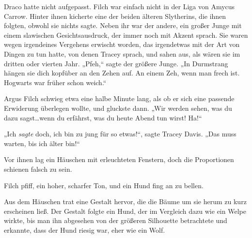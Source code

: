 Draco hatte nicht aufgepasst. Filch war einfach nicht in der Liga von Amycus Carrow.
Hinter ihnen kicherte eine der beiden älteren Slytherins, die ihnen folgten, obwohl sie nichts sagte. Neben ihr war der andere, ein großer Junge mit einem slawischen Gesichtsausdruck, der immer noch mit Akzent sprach. Sie waren wegen irgendeines Vergehens erwischt worden, das irgendetwas mit der Art von Dingen zu tun hatte, von denen Tracey sprach, und sahen aus, als wären sie im dritten oder vierten Jahr.
„Pfeh,“ sagte der größere Junge. „In Durmstrang hängen sie dich kopfüber an den Zehen auf. An einem Zeh, wenn man frech ist. Hogwarts war früher schon weich.“

Argus Filch schwieg etwa eine halbe Minute lang, als ob er sich eine passende Erwiderung überlegen wollte, und gluckste dann. „Wir werden sehen, was du dazu sagst…wenn du erfährst, was du heute Abend tun wirst! Ha!“

„Ich \emph{sagte} doch, ich bin zu jung für so etwas!“, sagte Tracey Davis. „Das muss warten, bis ich älter bin!“

Vor ihnen lag ein Häuschen mit erleuchteten Fenstern, doch die Proportionen schienen falsch zu sein.

Filch pfiff, ein hoher, scharfer Ton, und ein Hund fing an zu bellen.

Aus dem Häuschen trat eine Gestalt hervor, die die Bäume um sie herum zu kurz erscheinen ließ. Der Gestalt folgte ein Hund, der im Vergleich dazu wie ein Welpe wirkte, bis man ihn abgesehen von der größeren Silhouette betrachtete und erkannte, dass der Hund riesig war, eher wie ein Wolf.


